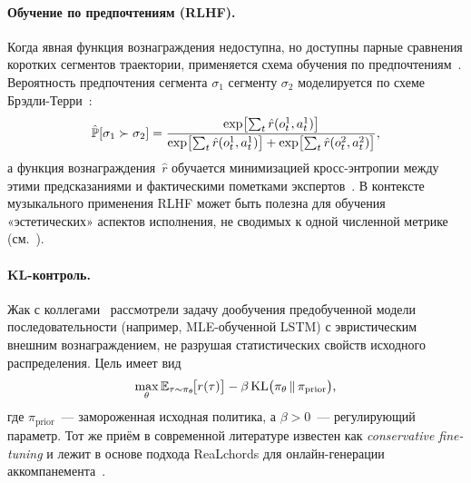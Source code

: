 \paragraph*{Обучение по предпочтениям (RLHF).} Когда явная
функция вознаграждения недоступна, но доступны парные сравнения
коротких сегментов траектории, применяется схема обучения
по предпочтениям~\cite{Christiano2017Preference}. Вероятность
предпочтения сегмента $\sigma_1$ сегменту $\sigma_2$ моделируется
по схеме Брэдли-Терри~\cite{BradleyTerry1952}:
\begin{equation}
\hat\Prb[\sigma_1 \succ \sigma_2] = \frac{\exp\bigl[\sum_t
\hat r(o_t^1, a_t^1)\bigr]}{\exp\bigl[\sum_t \hat r(o_t^1, a_t^1)
\bigr] + \exp\bigl[\sum_t \hat r(o_t^2, a_t^2)\bigr]},
\eqlab{rlhf-pref}
\end{equation}
а функция вознаграждения~$\hat r$ обучается минимизацией
кросс-энтропии между этими предсказаниями и фактическими
пометками экспертов~\cite[уравн.~1]{Christiano2017Preference}.
В контексте музыкального применения RLHF может быть полезна
для обучения «эстетических» аспектов исполнения, не сводимых
к одной численной метрике (см.~).

\paragraph*{KL-контроль.} Жак с коллегами~\cite{Jaques2017SeqTutor}
рассмотрели задачу дообучения предобученной модели
последовательности (например, MLE-обученной LSTM) с эвристическим
внешним вознаграждением, не разрушая статистических свойств
исходного распределения. Цель имеет вид
\begin{equation}
\max_\theta \Expect_{\tau\sim\pi_\theta}\!\bigl[r(\tau)\bigr]
- \beta\,\mathrm{KL}\bigl(\pi_\theta\,\|\,\pi_{\text{prior}}\bigr),
\eqlab{kl-control}
\end{equation}
где $\pi_{\text{prior}}$~--- замороженная исходная политика, а
$\beta>0$~--- регулирующий параметр. Тот же приём в современной
литературе известен как \textit{conservative fine-tuning} и
лежит в основе подхода ReaLchords для онлайн-генерации
аккомпанемента~\cite{Wu2024ReaLchords}.
